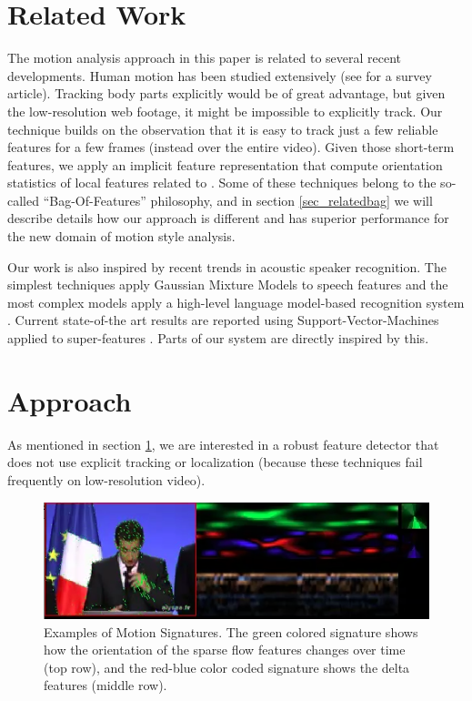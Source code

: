 \documentclass[times, 10pt,twocolumn]{article}
\begin{document}
\section{Related Work}
\label{sec_related}
The motion analysis approach in this paper is related to several recent developments.  Human motion has been studied extensively (see \cite{forsyth2005csh} for a survey article).  Tracking body parts explicitly would be of great advantage, but given the low-resolution web footage, it might be impossible to explicitly track. Our technique builds on the observation that it is easy to track just a few reliable features for a few frames (instead over the entire video).   Given those short-term features, we apply an implicit feature representation that compute orientation statistics of local features related to \cite{zelnikmanor2006sad,Dalal06humandetection,laptevCVPR08,niebles2008unsupervised,efros2003recognizing,DollarPETS05}.  Some of these techniques belong to the so-called ``Bag-Of-Features'' philosophy, and in section \ref{sec_relatedbag} we will describe details how our approach is different and has superior performance for the new domain of motion style analysis.

Our work is also inspired by recent trends in acoustic speaker recognition.   The simplest techniques apply Gaussian Mixture Models to speech features and the most complex models apply a high-level language model-based recognition system \cite{muller2007sci}. Current state-of-the art results are reported  using Support-Vector-Machines applied to super-features \cite{Campbell06supportvector}. Parts of our system are directly inspired by this.
\section{Approach}

As mentioned in section \ref{sec_related}, we are interested in a robust feature detector that does not use explicit tracking or localization (because these techniques fail frequently on low-resolution video).  
\begin{figure}[bt]
\centering
\includegraphics[width=0.96\columnwidth]{Sarkozy_MOS}
\caption{\label{fig_example_mos} \small Examples of Motion Signatures.  The green colored signature shows how the orientation of the sparse flow features changes over time (top row), and the red-blue color coded signature shows the delta features (middle row).}
\end{figure}
\end{document}

